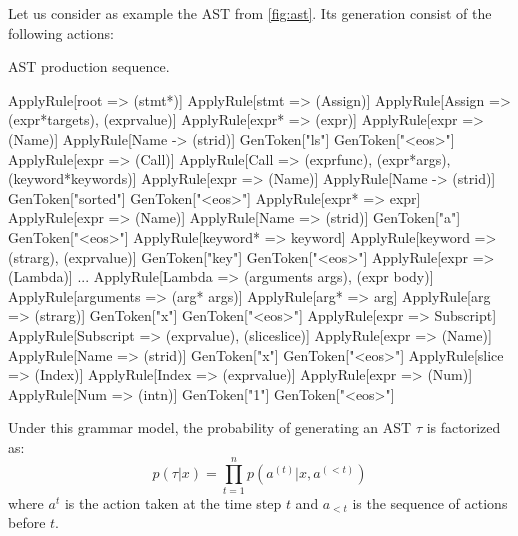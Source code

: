 Let us consider as example the AST from \cref{fig:ast}. Its generation consist of the following actions:

\begin{codelist}{AST production sequence.}
\begin{verbnobox}[\verbarg]
ApplyRule[root => (stmt*)]
    ApplyRule[stmt => (Assign)]
        ApplyRule[Assign => (expr*{targets}), (expr{value})]
            ApplyRule[expr* => (expr)]
                ApplyRule[expr => (Name)]
                    ApplyRule[Name -> (str{id})]
                        GenToken["ls"]
                        GenToken["<eos>"]
            ApplyRule[expr => (Call)]
                ApplyRule[Call => (expr{func}), (expr*{args}), (keyword*{keywords})]
                    ApplyRule[expr => (Name)]
                        ApplyRule[Name -> (str{id})]
                            GenToken["sorted"]
                            GenToken["<eos>"]
                    ApplyRule[expr* => expr]
                        ApplyRule[expr => (Name)]
                            ApplyRule[Name => (str{id})]
                                GenToken["a"]
                                GenToken["<eos>"]
                    ApplyRule[keyword* => keyword]
                        ApplyRule[keyword => (str{arg}), (expr{value})]
                            GenToken["key"]
                            GenToken["<eos>"]
                            ApplyRule[expr => (Lambda)]
...
ApplyRule[Lambda => (arguments args), (expr body)]
    ApplyRule[arguments => (arg* args)]
        ApplyRule[arg* => arg]
            ApplyRule[arg => (str{arg})]
                GenToken["x"]
                GenToken["<eos>"]
    ApplyRule[expr => Subscript]
        ApplyRule[Subscript => (expr{value}), (slice{slice})]
            ApplyRule[expr => (Name)]
                ApplyRule[Name => (str{id})]
                    GenToken["x"]
                    GenToken["<eos>"]
            ApplyRule[slice => (Index)]
                ApplyRule[Index => (expr{value})]
                    ApplyRule[expr => (Num)]
                        ApplyRule[Num => (int{n})]
                            GenToken["1"]
                            GenToken["<eos>"]
\end{verbnobox}
\label{code:ast_production}
\end{codelist}

Under this grammar model, the probability of generating an AST $\tau$ is factorized as:
\begin{equation}
p(\tau|x) = \prod^{n}_{t=1} p(a^{(t)}|x, a^{(<t)})
\label{eqn:tree_probability}
\end{equation}
where $a^{t}$ is the action taken at the time step $t$ and $a_{<t}$ is the sequence of actions before $t$. 

